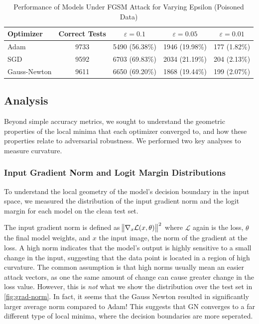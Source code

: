 \documentclass{article}
\begin{document}
    \begin{table}[ht!]
        \centering
        \caption{Performance of Models Under FGSM Attack for Varying Epsilon (Poisoned Data)}
        \label{tab:fgsm_results_poisoned}
        \begin{tabular}{|l|c|c|c|c|}
            \hline
            \textbf{Optimizer} & \textbf{Correct Tests} & $\varepsilon=0.1$ & $\varepsilon=0.05$ & $\varepsilon=0.01$ \\
            \hline
            Adam               & 9733                   & 5490 (56.38\%)    & 1946 (19.98\%)     & 177 (1.82\%)       \\
            \hline
            SGD                & 9592                   & 6703 (69.83\%)    & 2034 (21.19\%)     & 204 (2.13\%)       \\
            \hline
            Gauss-Newton       & 9611                   & 6650 (69.20\%)    & 1868 (19.44\%)     & 199 (2.07\%)       \\
            \hline
        \end{tabular}
    \end{table}

    \subsection{Analysis}
    Beyond simple accuracy metrics, we sought to understand the geometric properties of the local minima that each optimizer converged to, and how these properties relate to adversarial robustness.
    We performed two key analyses to measure curvature.

    \subsubsection{Input Gradient Norm and Logit Margin Distributions}
    To understand the local geometry of the model's decision boundary in the input space, we measured the distribution of the input gradient norm and the logit margin for each model on the clean test set.

    The input gradient norm is defined as $\norm{\nabla_x \mathcal L(x, \theta)}^2$ where $\mathcal L$ again is the loss, $\theta$ the final model weights, and $x$ the input image, the norm of the gradient at the loss.
    A high norm indicates that the model's output is highly sensitive to a small change in the input, suggesting that the data point is located in a region of high curvature.
    The common assumption is that high norms usually mean an easier attack vectors, as one the same amount of change can cause greater change in the loss value.
    However, this is \emph{not} what we show the distribution over the test set in \cref{fig:grad-norm}.
    In fact, it seems that the Gauss Newton resulted in significantly larger average norm compared to Adam!
    This suggests that GN converges to a far different type of local minima, where the decision boundaries are more seperated.
\end{document}
